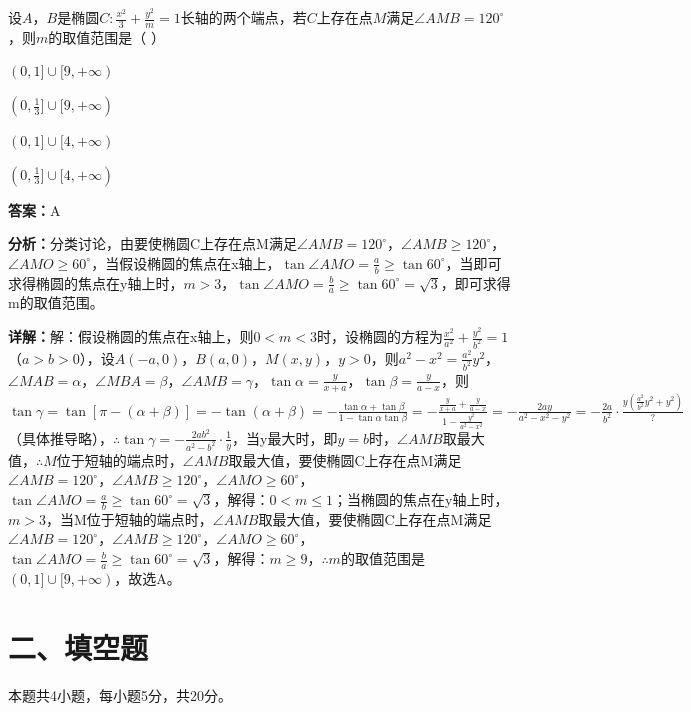 \begin{question}[points=5]
设$A$，$B$是椭圆$C:\frac{x^2}{3}+\frac{y^2}{m}=1$长轴的两个端点，若$C$上存在点$M$满足$\angle AMB=120^\circ$，则$m$的取值范围是（            ）
\begin{choices}
  \item $(0,1]\cup[9,+\infty)$
  \item $(0,\frac{1}{3}]\cup[9,+\infty)$
  \item $(0,1]\cup[4,+\infty)$
  \item $(0,\frac{1}{3}]\cup[4,+\infty)$
\end{choices}
\begin{solution}
\textbf{答案：}A

\textbf{分析：}分类讨论，由要使椭圆C上存在点M满足$\angle AMB=120^\circ$，$\angle AMB\ge 120^\circ$，$\angle AMO\ge 60^\circ$，当假设椭圆的焦点在x轴上，$\tan\angle AMO=\frac{a}{b}\ge\tan60^\circ$，当即可求得椭圆的焦点在y轴上时，$m>3$，$\tan\angle AMO=\frac{b}{a}\ge\tan60^\circ=\sqrt{3}$，即可求得m的取值范围。

\textbf{详解：}解：假设椭圆的焦点在x轴上，则$0<m<3$时，设椭圆的方程为$\frac{x^2}{a^2}+\frac{y^2}{b^2}=1$（$a>b>0$），设$A(-a,0)$，$B(a,0)$，$M(x,y)$，$y>0$，则$a^2-x^2=\frac{a^2}{b^2}y^2$，$\angle MAB=\alpha$，$\angle MBA=\beta$，$\angle AMB=\gamma$，$\tan\alpha=\frac{y}{x+a}$，$\tan\beta=\frac{y}{a-x}$，则$\tan\gamma=\tan[\pi-(\alpha+\beta)]=-\tan(\alpha+\beta)=-\frac{\tan\alpha+\tan\beta}{1-\tan\alpha\tan\beta}=-\frac{\frac{y}{x+a}+\frac{y}{a-x}}{1-\frac{y^2}{a^2-x^2}}=-\frac{2ay}{a^2-x^2-y^2}=-\frac{2a}{b^2}\cdot\frac{y(\frac{a^2}{b^2}y^2+y^2)}{?}$（具体推导略），$\therefore\tan\gamma=-\frac{2ab^2}{a^2-b^2}\cdot\frac{1}{y}$，当y最大时，即$y=b$时，$\angle AMB$取最大值，$\therefore M$位于短轴的端点时，$\angle AMB$取最大值，要使椭圆C上存在点M满足$\angle AMB=120^\circ$，$\angle AMB\ge 120^\circ$，$\angle AMO\ge 60^\circ$，$\tan\angle AMO=\frac{a}{b}\ge\tan60^\circ=\sqrt{3}$，解得：$0<m\le 1$；当椭圆的焦点在y轴上时，$m>3$，当M位于短轴的端点时，$\angle AMB$取最大值，要使椭圆C上存在点M满足$\angle AMB=120^\circ$，$\angle AMB\ge 120^\circ$，$\angle AMO\ge 60^\circ$，$\tan\angle AMO=\frac{b}{a}\ge\tan60^\circ=\sqrt{3}$，解得：$m\ge 9$，$\therefore m$的取值范围是$(0,1]\cup[9,+\infty)$，故选A。
\end{solution}
\end{question}

\section*{二、填空题}
本题共4小题，每小题5分，共20分。

